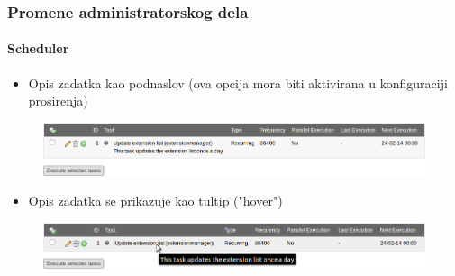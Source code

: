 
\begin{frame}[fragile]
	\frametitle{Promene administratorskog dela}
	\framesubtitle{Scheduler}

	\begin{itemize}
		\item Opis zadatka kao podnaslov\newline
			\small(ova opcija mora biti aktivirana u konfiguraciji prosirenja)\normalsize
	\end{itemize}

	\begin{figure}
		\includegraphics[width=0.95\linewidth]{Images/BackendChanges/SchedulerTaskDescriptionAsSubheader.png}
	\end{figure}

	\begin{itemize}
		\item Opis zadatka se prikazuje kao tultip 
		("hover")
	\end{itemize}

	\begin{figure}
		\includegraphics[width=0.95\linewidth]{Images/BackendChanges/SchedulerTaskDescriptionAsTooltip.png}
	\end{figure}

\end{frame}



